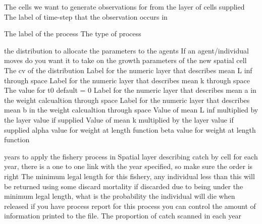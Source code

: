  {The cells we want to generate observations for from the layer of cells supplied}
 {The label of time-step that the observation occurs in}
\par\par
{} {The label of the process}
 {The type of process}
\par\textbf{}\par
{} {the distribution to allocate the parameters to the agents}
 {If an agent/individual moves do you want it to take on the growth parameters of the new spatial cell}
 {The cv of the distribution}
 {Label for the numeric layer that describes mean L inf through space}
 {Label for the numeric layer that describes mean k through space}
 {The value for t0 default = 0}
 {Label for the numeric layer that describes mean a in the weight calcualtion through space}
 {Label for the numeric layer that describes mean b in the weight calcualtion through space}
 {Value of mean L inf multiplied by the layer value if supplied}
 {Value of mean k multiplied by the layer value if supplied}
 {alpha value for weight at length function}
 {beta value for weight at length function}
\par\textbf{}\par
\par\textbf{}\par
{} {years to apply the fishery process in}
 {Spatial layer describing catch by cell for each year, there is a one to one link with the year specified, so make sure the order is right}
 {The minimum legal length for this fishery, any individual less than this will be returned using some discard mortality}
 {if discarded due to being under the minimum legal length, what is the probability the individual will die when released}
 {if you have process report for this process you can control the amount of information printed to the file.}
 {The proportion of catch scanned in each year}
